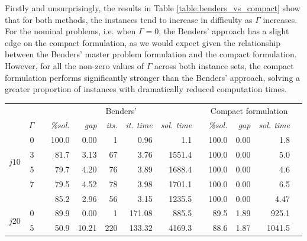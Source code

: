\documentclass[a4paper,abstracton]{scrartcl}
\begin{document}
Firstly and unsurprisingly, the results in Table \ref{table:benders_vs_compact} show that for both methods, the instances tend to increase in difficulty as $\Gamma$ increases. For the nominal problems, i.e. when $\Gamma=0$, the Benders' approach has a slight edge on the compact formulation, as we would expect given the relationship between the Benders' master problem formulation and the compact formulation. However, for all the non-zero values of $\Gamma$ across both instance sets, the compact formulation performs significantly stronger than the Benders' approach, solving a greater proportion of instances with dramatically reduced computation times. 

\begin{table}[h]
\centering
\small  %
{\renewcommand{\arraystretch}{1.2}  %
\begin{tabular}{lrrrrrrrrrrrr}
		     \hline \hline
		     &      & & \multicolumn{5}{c}{Benders'}                                       & & \multicolumn{3}{c}{Compact formulation} \\
		     \cline{4-8} \cline{10-12}
		     & $\Gamma$ & & \textit{\%sol.} & \textit{gap} & \textit{its.} & \textit{it. time} & \textit{sol. time} & & \textit{\%sol.}   & \textit{gap}   & \textit{sol. time}   \\
		     \hline
	\multirow{4}{*}{$j10$} & 0    & & 100.0    & 0.00     & 1            & 0.96          & 1.1	    & & 100.0      & 0.00       & 1.8             \\
			       & 3    & & 81.7     & 3.13     & 67           & 3.76          & 1551.4       & & 100.0      & 0.00       & 5.0             \\
			       & 5    & & 79.7     & 4.20     & 76           & 3.89          & 1688.4       & & 100.0      & 0.00       & 4.6             \\
			       & 7    & & 79.5     & 4.52     & 78           & 3.98          & 1701.1       & & 100.0      & 0.00       & 6.5             \\
		     \cline{4-8} \cline{10-12}
			       &      & & 85.2	   & 2.96     & 56	     & 3.15 	     & 1235.5	    & & 100.0      & 0.00	& 4.47 		  \\
		     \hline
	\multirow{4}{*}{$j20$} & 0    & & 89.9     & 0.00     & 1            & 171.08        & 885.5        & & 89.5       & 1.89       & 925.1           \\
			       & 5    & & 50.9     & 10.21    & 220          & 133.32        & 4169.3       & & 88.6       & 1.87       & 1041.5          \\

\end{tabular}}
\end{table}
\end{document}

